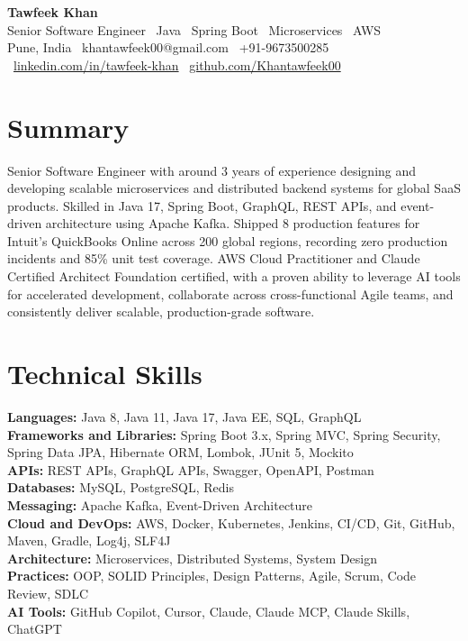 \documentclass[10pt, letterpaper]{article}
\begin{document}
\begin{center}
    {\huge \textbf{Tawfeek Khan}} \\[2pt]
    {\large Senior Software Engineer \textbar\ Java \textbar\ Spring Boot \textbar\ Microservices \textbar\ AWS} \\[1pt]
    \small
    Pune, India \textbar\
    khantawfeek00@gmail.com \textbar\
    +91-9673500285 \textbar\
    \href{https://www.linkedin.com/in/tawfeek-khan/}{linkedin.com/in/tawfeek-khan} \textbar\
    \href{https://github.com/Khantawfeek00}{github.com/Khantawfeek00}
\end{center}

\section{Summary}
Senior Software Engineer with around 3 years of experience designing and developing scalable microservices and distributed backend systems for global SaaS products. Skilled in Java 17, Spring Boot, GraphQL, REST APIs, and event-driven architecture using Apache Kafka. Shipped 8 production features for Intuit's QuickBooks Online across 200 global regions, recording zero production incidents and 85\% unit test coverage. AWS Cloud Practitioner and Claude Certified Architect Foundation certified, with a proven ability to leverage AI tools for accelerated development, collaborate across cross-functional Agile teams, and consistently deliver scalable, production-grade software.

\section{Technical Skills}
\textbf{Languages:} Java 8, Java 11, Java 17, Java EE, SQL, GraphQL \\
\textbf{Frameworks and Libraries:} Spring Boot 3.x, Spring MVC, Spring Security, Spring Data JPA, Hibernate ORM, Lombok, JUnit 5, Mockito \\
\textbf{APIs:} REST APIs, GraphQL APIs, Swagger, OpenAPI, Postman \\
\textbf{Databases:} MySQL, PostgreSQL, Redis \\
\textbf{Messaging:} Apache Kafka, Event-Driven Architecture \\
\textbf{Cloud and DevOps:} AWS, Docker, Kubernetes, Jenkins, CI/CD, Git, GitHub, Maven, Gradle, Log4j, SLF4J \\
\textbf{Architecture:} Microservices, Distributed Systems, System Design \\
\textbf{Practices:} OOP, SOLID Principles, Design Patterns, Agile, Scrum, Code Review, SDLC \\
\textbf{AI Tools:} GitHub Copilot, Cursor, Claude, Claude MCP, Claude Skills, ChatGPT
\end{document}
